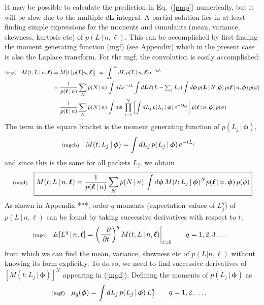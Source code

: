 \documentclass[11pt]{article}
\newcommand{\lleq}[1]{\label{#1} }
\renewcommand{\lleq}[1]{\label{#1} {\scriptstyle {\rm (#1)}} \hspace*{2ex} }
\newcommand{\cond}{\,|\,}
\newcommand{\bml}{{\bm{\ell}}}
\newcommand{\bmL}{{\bm{L}}}
\newcommand{\bmphi}{{\bm{\phi}}}
\begin{document}
It may be possible to calculate the prediction in Eq.~(\ref{pmp})
numerically, but it will be slow due to the multiple $d\bmL$
integral. A partial solution lies in at least finding simple
expressions for the moments and cumulants (mean, variance, skewness,
kurtosis etc) of $p(L\cond n,\ell)$. This can be accomplished by first
finding the moment generating function (mgf) (see Appendix) which in
the present case is also the Laplace transform.  For the mgf, the
convolution is easily accomplished:
\begin{align}
  \lleq{mgc}
  M(t;L\cond n,\bml) &= M[t\cond p(L|n,\bml)]
  \ =\ \int_0^\infty dL\,p(L\cond n,\bml)\,e^{-tL} \\
  &= \frac{1}{p(\bml\cond n)}
  \sum_N p(N\cond n)\,\int dL e^{-tL} \int d\bmL\,\delta(L - \textstyle\sum_j L_j)
  \displaystyle\int d\bmphi\,p(\bmL\cond N,\bmphi) \, p(\bml\cond n,\bmphi)
  \, p(\phi)\\
  &= \frac{1}{p(\bml\cond n)}
  \sum_N p(N\cond n)\,\int d\bmphi\,
  \prod_{j=1}^N \left[ \int dL_j\,p(L_j\cond \bmphi)\,e^{-tL_j}\right]
   p(\bml\cond n,\bmphi) \, p(\phi)
\end{align}
The term in the square bracket is the moment generating function of
$p(L_j\cond \bmphi)$,
\begin{align}
  \lleq{mgcb}
  M(t; L_j\cond \bmphi) &=
  \int dL_j\,p(L_j\cond \bmphi)\,e^{-tL_j}
\end{align}
and since this is the same for all packets $L_j$, we obtain
\begin{equation}
  \lleq{mgd}
  \boxed{
  M(t;L\cond n,\bml) %
  = \frac{1}{p(\bml\cond n)}
  \sum_N p(N\cond n)\,\int d\bmphi\,
  M(t; L_j\cond \bmphi)^N
   p(\bml\cond n,\bmphi) \, p(\phi)
   }
\end{equation}
As shown in Appendix ***, order-$q$ moments (expectation values of
$L_j^q$) of $p(L\cond n,\bml)$ can be found by taking successive
derivatives with respect to $t$,
\begin{align}
  \lleq{mge}
  E[L^q\cond n,\bml]
  &= \left(\frac{-\partial}{\partial t}\right)^q M(t;L\cond n,\bml)\biggr|_{t=0}
  \qquad q = 1,2,3\ldots
\end{align}
from which we can find the mean, variance, skewness etc of
$p(L|n,\bml)$ without knowing its form explicitly. To do so, we need
to find successive derivatives of $\left[ M(t; L_j\cond \bmphi)
\right]^N$ appearing in (\ref{mgd}). Defining the moments of
$p(L_j\cond\bmphi)$ as
\begin{align}
  \lleq{mgf}
  \mu_q(\bmphi) &= \int dL_j\,p(L_j\cond\bmphi)\,L_j^q \qquad q = 1,2,\ldots,
\end{align}
\end{document}
